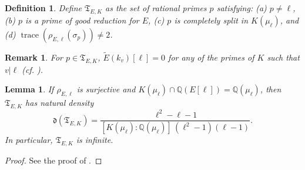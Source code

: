 \documentclass[11pt,reqno]{amsart}
\newtheorem{lemma}[theorem]{Lemma}
\newtheorem{definition}[theorem]{Definition}
\newtheorem{remark}[theorem]{Remark}
\newcommand{\Q}{\mathbb{Q}}
\newcommand{\op}[1]{\operatorname{#1}}
\numberwithin{equation}{section}
\begin{document}
\begin{definition}\label{defn of TE}Define \( \mathfrak{T}_{E,K} \) as the set of rational primes \( p \) satisfying: (a) \( p \neq \ell \), (b) \( p \) is a prime of good reduction for \( E \), (c) \( p \) is completely split in \( K(\mu_\ell) \), and (d) \(\op{trace}(\rho_{E,\ell}(\sigma_p)) \neq 2 \).
\end{definition}
\begin{remark}\label{TE remark}For $p\in \mathfrak{T}_{E,K}$, $\widetilde{E}(k_v)[\ell]=0$ for any of the primes of $K$ such that $v|\ell$ (cf. \cite[Lemma 2.11]{pathakray}). 
\end{remark}


\begin{lemma}\label{density lemma}
   If \(\rho_{E, \ell}\) is surjective and \(K(\mu_\ell) \cap \Q(E[\ell]) = \Q(\mu_\ell)\), then \(\mathfrak{T}_{E,K}\) has natural density  
\[
\mathfrak{d}(\mathfrak{T}_{E,K}) = \frac{\ell^2 - \ell - 1}{[K(\mu_\ell):\Q(\mu_\ell)]\,(\ell^2-1)(\ell-1)}.
\]
In particular, \(\mathfrak{T}_{E,K}\) is infinite.
\end{lemma}
\begin{proof}
See the proof of \cite[Lemma 2.12]{pathakray}.
\end{proof}
\end{document}
